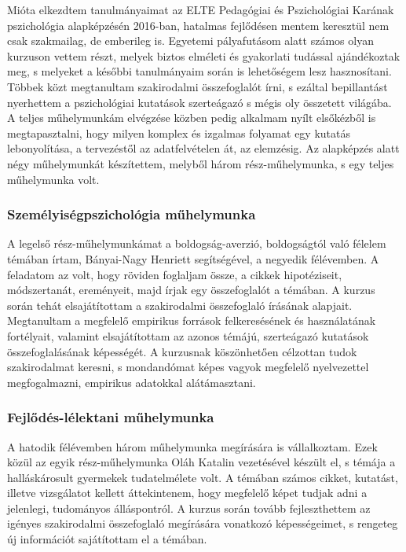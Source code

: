 \par Mióta elkezdtem tanulmányaimat az ELTE Pedagógiai és Pszichológiai Karának pszichológia alapképzésén 2016-ban, hatalmas fejlődésen mentem keresztül nem csak szakmailag, de emberileg is. Egyetemi pályafutásom alatt számos olyan kurzuson vettem részt, melyek biztos elméleti és gyakorlati tudással ajándékoztak meg, s melyeket a későbbi tanulmányaim során is lehetőségem lesz hasznosítani. Többek közt megtanultam szakirodalmi összefoglalót írni, s ezáltal bepillantást nyerhettem a pszichológiai kutatások szerteágazó s mégis oly összetett világába. A teljes műhelymunkám elvégzése közben pedig alkalmam nyílt elsőkézből is megtapasztalni, hogy milyen komplex és izgalmas folyamat egy kutatás lebonyolítása, a tervezéstől az adatfelvételen át, az elemzésig. Az alapképzés alatt négy műhelymunkát készítettem, melyből három rész-műhelymunka, s egy teljes műhelymunka volt. 

\subsubsection*{Személyiségpszichológia műhelymunka}

\par A legelső rész-műhelymunkámat a boldogság-averzió, boldogságtól való félelem témában írtam, Bányai-Nagy Henriett segítségével, a negyedik félévemben. A feladatom az volt, hogy röviden foglaljam össze, a cikkek hipotéziseit, módszertanát, ereményeit, majd írjak egy összefoglalót a témában. A kurzus során tehát elsajátítottam a szakirodalmi összefoglaló írásának alapjait. Megtanultam a megfelelő empirikus források felkeresésének és használatának fortélyait, valamint elsajátítottam az azonos témájú, szerteágazó kutatások összefoglalásának képességét. A kurzusnak köszönhetően célzottan tudok szakirodalmat keresni, s mondandómat képes vagyok megfelelő nyelvezettel megfogalmazni, empirikus adatokkal alátámasztani.

\subsubsection*{Fejlődés-lélektani műhelymunka}

\par A hatodik félévemben három műhelymunka megírására is vállalkoztam. Ezek közül az egyik rész-műhelymunka Oláh Katalin vezetésével készült el, s témája a halláskárosult gyermekek tudatelmélete volt. A témában számos cikket, kutatást, illetve vizsgálatot kellett áttekintenem, hogy megfelelő képet tudjak adni a jelenlegi, tudományos álláspontról. A kurzus során tovább fejleszthettem az igényes szakirodalmi összefoglaló megírására vonatkozó képességeimet, s rengeteg új információt sajátítottam el a témában. 

